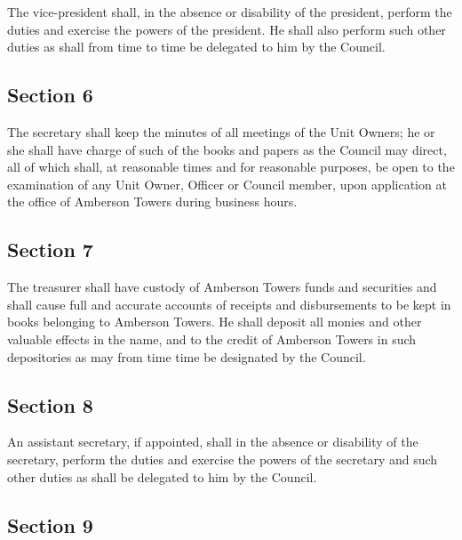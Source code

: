\documentclass[
  14pt,
]{book}
\begin{document}
The vice-president shall, in the absence or disability of the president, perform the duties and exercise the powers of the president. He shall also perform such other duties as shall from time to time be delegated to him by the Council.

\hypertarget{section-6-2}{%
\subsection*{Section 6}\label{section-6-2}}

The secretary shall keep the minutes of all meetings of the Unit Owners; he or she shall have charge of such of the books and papers as the Council may direct, all of which shall, at reasonable times and for reasonable purposes, be open to the examination of any Unit Owner, Officer or Council member, upon application at the office of Amberson Towers during business hours.

\hypertarget{section-7-2}{%
\subsection*{Section 7}\label{section-7-2}}

The treasurer shall have custody of Amberson Towers funds and securities and shall cause full and accurate accounts of receipts and disbursements to be kept in books belonging to Amberson Towers. He shall deposit all monies and other valuable effects in the name, and to the credit of Amberson Towers in such depositories as may from time time be designated by the Council.

\hypertarget{section-8-2}{%
\subsection*{Section 8}\label{section-8-2}}

An assistant secretary, if appointed, shall in the absence or disability of the secretary, perform the duties and exercise the powers of the secretary and such other duties as shall be delegated to him by the Council.

\hypertarget{section-9-2}{%
\subsection*{Section 9}\label{section-9-2}}
\end{document}
